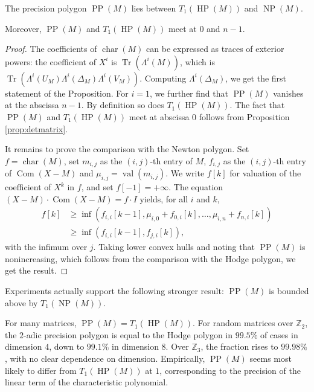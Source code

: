 \documentclass{sig-alternate}
\DeclareMathOperator{\NP}{NP}
\DeclareMathOperator{\HP}{HP}
\DeclareMathOperator{\PP}{PP}
\DeclareMathOperator{\val}{val}
\DeclareMathOperator{\tr}{Tr}
\DeclareMathOperator{\com}{Com}
\newcommand{\Z}{\mathbb Z}
\DeclareMathOperator{\charpoly}{char}
\begin{document}
\begin{prop} \label{prop:polygons}
The precision polygon $\PP(M)$ lies between $T_1(\HP(M))$
and $\NP(M)$.

Moreover, $\PP(M)$ and $T_1(\HP(M))$ meet at $0$ and $n{-}1$.
\end{prop}

\begin{proof}
The coefficients of $\charpoly(M)$ can be expressed as traces of 
exterior powers: the coefficient of $X^i$ is $\tr(\Lambda^i(M))$,
which is $\tr(\Lambda^i(U_M) \Lambda^i(\Delta_M) \Lambda^i(V_M))$.  
Computing $\Lambda^i(\Delta_M)$, we get the first statement of
the Proposition. For $i = 1$, we further find that $\PP(M)$ vanishes
at the abscissa $n{-}1$. By definition so does $T_1(\HP(M))$. The fact 
that $\PP(M)$ and $T_1(\HP(M))$ meet at abscissa $0$ follows from
Proposition \ref{prop:detmatrix}.

It remains to prove the comparison with the Newton polygon.
Set $f = \charpoly(M)$, set $m_{i,j}$ as the $(i,j)$-th entry of $M$, 
$f_{i,j}$ as the $(i,j)$-th entry of $\com(X{-}M)$ and $\mu_{i,j} = 
\val(m_{i,j})$. We write $f[k]$ 
for valuation of the coefficient of $X^k$ in $f$, and set $f[-1] = 
+\infty$. The equation $(X{-}M) \cdot \com(X{-}M) = f \cdot I$ yields, 
for all $i$ and $k$,
\begin{align*}
f[k] &\ge \inf(f_{i,i}[k{-}1], \mu_{i,0} + f_{0,i}[k], \ldots, 
\mu_{i,n} + f_{n,i}[k]) \\
&\ge \inf(f_{i,i}[k{-}1], f_{j,i}[k]),
\end{align*}
with the infimum over $j$. 
Taking lower convex hulls and noting that $\PP(M)$ is nonincreasing,
which follows from the comparison with the Hodge polygon, we get the 
result.
\end{proof}

\begin{rem}
Experiments actually support the following stronger result: $\PP(M)$ is 
bounded above by $T_1(\NP(M))$.
\end{rem}

For many matrices, $\PP(M) = T_1(\HP(M))$.  For random matrices over 
$\Z_2$, the $2$-adic precision polygon is equal to the Hodge polygon in 
$99.5\%$ of cases in dimension $4$, down to $99.1\%$ in dimension $8$.  
Over $\Z_3$, the fraction rises to $99.98\%$, with no clear dependence on 
dimension.
Empirically, $\PP(M)$ seems most likely to differ from $T_1(\HP(M))$ at 
$1$, corresponding to the precision of the linear term of the 
characteristic polynomial.
\end{document}
